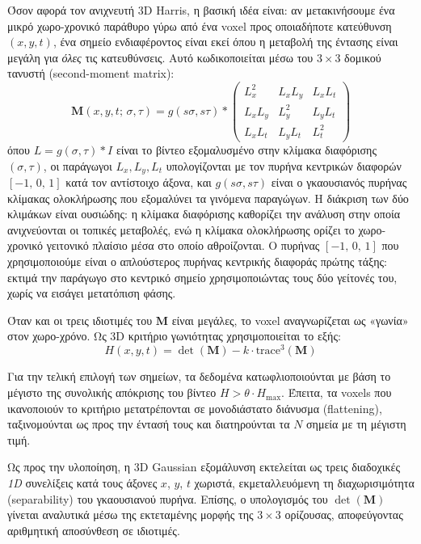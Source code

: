 \documentclass[12pt, a4paper]{article}
\begin{document}
Όσον αφορά τον ανιχνευτή 3D Harris, η βασική ιδέα είναι: αν μετακινήσουμε
ένα μικρό χωρο-χρονικό παράθυρο γύρω από ένα voxel προς οποιαδήποτε κατεύθυνση
$(x, y, t)$, ένα σημείο ενδιαφέροντος είναι εκεί όπου η μεταβολή της έντασης
είναι μεγάλη για \emph{όλες} τις κατευθύνσεις. Αυτό κωδικοποιείται μέσω του
$3\times3$ δομικού τανυστή (second-moment matrix):
\begin{equation}
    \mathbf{M}(x,y,t;\,\sigma,\tau) = g(s\sigma,s\tau) \ast
    \begin{pmatrix}
        L_x^2    & L_x L_y & L_x L_t \\
        L_x L_y  & L_y^2   & L_y L_t \\
        L_x L_t  & L_y L_t & L_t^2
    \end{pmatrix}
\end{equation}
όπου $L = g(\sigma,\tau) \ast I$ είναι το βίντεο εξομαλυσμένο στην κλίμακα
διαφόρισης $(\sigma, \tau)$, οι παράγωγοι $L_x, L_y, L_t$ υπολογίζονται με τον
πυρήνα κεντρικών διαφορών $[-1,\,0,\,1]$ κατά τον αντίστοιχο άξονα, και
$g(s\sigma, s\tau)$ είναι ο γκαουσιανός πυρήνας κλίμακας ολοκλήρωσης
που εξομαλύνει τα γινόμενα παραγώγων. Η διάκριση των δύο κλιμάκων είναι
ουσιώδης: η κλίμακα διαφόρισης καθορίζει την ανάλυση στην οποία ανιχνεύονται οι
τοπικές μεταβολές, ενώ η κλίμακα ολοκλήρωσης ορίζει το χωρο-χρονικό γειτονικό
πλαίσιο μέσα στο οποίο αθροίζονται.
Ο πυρήνας $[-1,\,0,\,1]$ που χρησιμοποιούμε είναι ο απλούστερος πυρήνας κεντρικής διαφοράς πρώτης
τάξης: εκτιμά την παράγωγο στο κεντρικό σημείο χρησιμοποιώντας τους δύο γείτονές
του, χωρίς να εισάγει μετατόπιση φάσης.

Όταν και οι τρεις ιδιοτιμές του $\mathbf{M}$ είναι μεγάλες, το voxel αναγνωρίζεται
ως «γωνία» στον χωρο-χρόνο. Ως 3D κριτήριο γωνιότητας χρησιμοποιείται
το εξής:
\begin{equation}
    H(x,y,t) = \det(\mathbf{M}) - k \cdot \mathrm{trace}^3(\mathbf{M})
\end{equation}

Για την τελική επιλογή των σημείων, τα δεδομένα κατωφλιοποιούνται με βάση το μέγιστο της συνολικής απόκρισης του βίντεο $H > \theta \cdot H_{\max}$. Έπειτα, τα voxels που ικανοποιούν το κριτήριο μετατρέπονται σε μονοδιάστατο διάνυσμα (flattening), ταξινομούνται ως προς την έντασή τους και διατηρούνται τα $N$ σημεία με τη μέγιστη τιμή.

Ως προς την υλοποίηση, η 3D Gaussian εξομάλυνση εκτελείται ως τρεις διαδοχικές
\emph{1D} συνελίξεις κατά τους άξονες $x$, $y$, $t$ χωριστά, εκμεταλλευόμενη τη
διαχωρισιμότητα (separability) του γκαουσιανού πυρήνα. Επίσης, ο υπολογισμός του
$\det(\mathbf{M})$ γίνεται αναλυτικά μέσω της εκτεταμένης μορφής της $3\times3$
ορίζουσας, αποφεύγοντας αριθμητική αποσύνθεση σε ιδιοτιμές.
\end{document}
